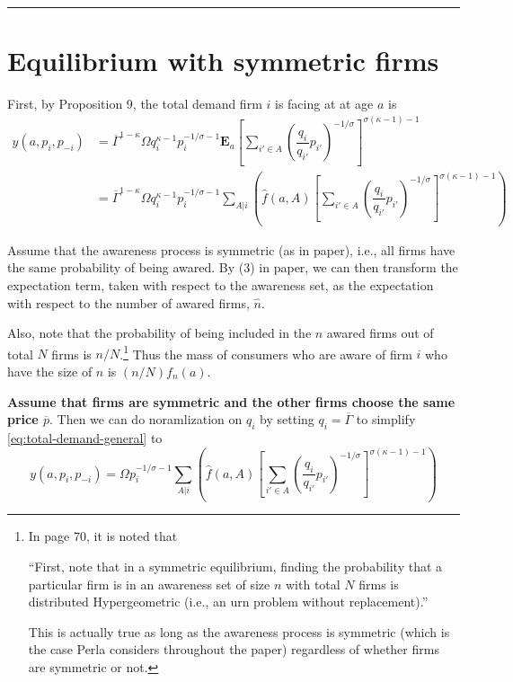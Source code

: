 \documentclass[12pt]{article}
\newcommand{\E}{\mathbf{E}}
\theoremstyle{definition}
\begin{document}
	

 \\ 
\noindent\rule{\textwidth}{.1mm}
\section{Equilibrium with symmetric firms}
First, by Proposition 9, the total demand firm $i$ is facing at at age $a$ is 
\begin{align}
y(a, p_i, p_{-i}) &= \overline{\Gamma}^{1 - \kappa} \Omega q_i^{\kappa-1} p_i^{-1/\sigma-1} \E_a  \left[ \sum_{i' \in A} \left( \dfrac{q_i}{q_{i'}} p_{i'} \right)^{-1/\sigma}  \right]^{\sigma(\kappa-1) -1} \\
&= \overline{\Gamma}^{1 - \kappa} \Omega q_i^{\kappa-1} p_i^{-1/\sigma-1} \sum_{A | i } \left( \widehat f (a, A) \left[ \sum_{i' \in A} \left( \dfrac{q_i}{q_{i'}} p_{i'} \right)^{-1/\sigma}  \right]^{\sigma(\kappa-1) -1} \right) \label{eq:total-demand-general}
\end{align}

Assume that the awareness process is symmetric (as in paper), i.e., all firms have the same probability of being awared. By (3) in paper, we can then transform the expectation term, taken with respect to the awareness set, as the expectation with respect to the number of awared firms, $\widehat n$. 

Also, note that the probability of being included in the $n$ awared firms out of total $N$ firms is $n/N$.\footnote{In page 70, it is noted that 
	
	``First, note that in a symmetric equilibrium, finding the probability that a particular firm is in an awareness set of size $n$ with total $N$ firms is distributed Hypergeometric (i.e., an urn	problem without replacement).''
	
	This is actually true as long as the awareness process is symmetric (which is the case Perla considers throughout the paper) regardless of whether firms are symmetric or not.} Thus the mass of consumers who are aware of firm $i$ who have the size of $n$ is $(n/N )f_n(a)$. 

\textbf{Assume that firms are symmetric and the other firms choose the same price $\overline p$}. Then we can do noramlization on $q_i$ by setting $q_i = \overline{\Gamma}$ to simplify \autoref{eq:total-demand-general} to 
\begin{equation}\label{eq:total-demand-general-simple}
y(a, p_i, p_{-i}) = \Omega  p_i^{-1/\sigma-1} \sum_{A | i } \left( \widehat f (a, A) \left[ \sum_{i' \in A} \left( \dfrac{q_i}{q_{i'}} p_{i'} \right)^{-1/\sigma}  \right]^{\sigma(\kappa-1) -1} \right)
\end{equation}
\end{document}
